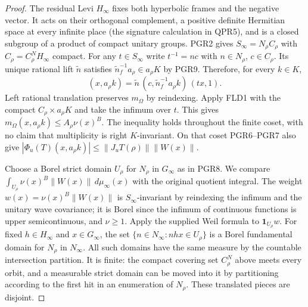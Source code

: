 \begin{proof}
The residual Levi $H_\infty$ fixes both hyperbolic frames and the
negative vector. It acts on their orthogonal complement, a positive
definite Hermitian space at every infinite place (the signature
calculation in QPR5), and is a closed subgroup of a product of
compact unitary groups. PGR2 gives
$S_\infty=N_\rho C_\rho$ with $C_\rho=C_\rho^N H_\infty$ compact.
For any $t\in S_\infty$ write $t^{-1}=n c$ with $n\in N_\rho$,
$c\in C_\rho$. Its unique rational lift $\tilde n$ satisfies
$\tilde n_f^{-1}a_\rho\in a_\rho K$ by PGR9. Therefore, for
every $k\in K$,
\[
    (x,a_\rho k)=\tilde n\,
          (c,\tilde n_f^{-1}a_\rho k)\,(t x,1).
\]
Left rational translation preserves $m_\Omega$ by reindexing.
Apply FLD1 with the compact $C_\rho\times a_\rho K$ and take the
infimum over $t$. This gives $m_\Omega(x,a_\rho k)\le A_\rho\nu(x)^B$.
The inequality holds throughout the finite coset, with no claim that
multiplicity is right $K$-invariant. On that coset PGR6--PGR7 also
give $|\Phi_u(T)(x,a_\rho k)|\le\|J_u T(\rho)\|\|W(x)\|$.

Choose a Borel strict domain $U_\rho$ for $N_\rho$ in $G_\infty$ as
in PGR8. We compare
$\int_{U_\rho}\nu(x)^B\|W(x)\|\,d\mu_\infty(x)$ with the original
quotient integral. The weight $w(x)=\nu(x)^B\|W(x)\|$ is
$S_\infty$-invariant by reindexing the infimum and the unitary wave
covariance; it is Borel since the infimum of continuous functions
is upper semicontinuous, and $\nu\ge1$. Apply the supplied Weil
formula to $\mathbf1_{U_\rho}w$. For fixed $h\in H_\infty$ and
$x\in G_\infty$, the set $\{n\in N_\infty:n h x\in U_\rho\}$
is a Borel fundamental domain for $N_\rho$ in $N_\infty$.
All such domains have the same measure by the countable intersection
partition. It is finite: the compact covering set $C_\rho^N$ above
meets every orbit, and a measurable strict domain can be moved into
it by partitioning according to the first hit in an enumeration
of $N_\rho$. These translated pieces are disjoint.


\end{proof}
